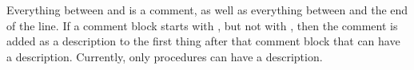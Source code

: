 
Everything between \code{/*} and \code{*/} is a comment, as well as everything between \code{//} and the end of the line.  
If a comment block starts with \code{/**}, but not with \code{/***}, then the comment is added as a description to the 
first thing after that comment block that can have a description.  Currently, only procedures can have a description.


